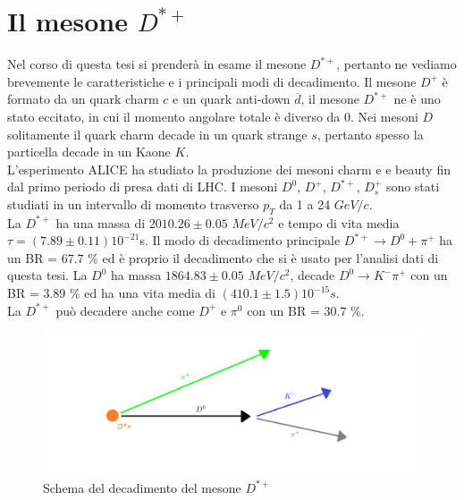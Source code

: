 \section{Il mesone $D^{*+}$} \label{mesoneD}
Nel corso di questa tesi si prenderà in esame il mesone $D^{*+}$, pertanto ne vediamo brevemente le caratteristiche e i principali modi di decadimento. Il mesone $D^{+}$ è formato da un quark charm $c$ e un quark anti-down $\overline{d}$, il mesone $D^{*+}$ ne è uno stato eccitato, in cui il momento angolare totale è diverso da 0. Nei mesoni $D$ solitamente il quark charm decade in un quark strange $s$, pertanto spesso la particella decade in un Kaone $K$. 
\\L'esperimento ALICE ha studiato la produzione dei mesoni charm e e beauty fin dal primo periodo di presa dati di LHC. I mesoni $D^0$, $D^+$, $D^{*+}$, $D_s^+$  sono stati studiati in un intervallo di momento trasverso $p_T$ da 1 a 24 $GeV/c$.  \cite{mesoniD}
\\La $D^{*+}$ ha una massa di $2010.26 \pm 0.05$ $MeV/c^2$ e tempo di vita media $ \tau = (7.89 \pm 0.11) {10^{-21}}$s. Il modo di decadimento principale $D^{*+} \rightarrow D^0 + \pi^+ $ ha un BR = $67.7$ $\% $ ed è proprio il decadimento che si è usato per l'analisi dati di questa tesi. La $D^0$ ha massa $ 1864.83 \pm 0.05 $ $MeV/c^2$, decade $D^0 \rightarrow K^- \pi^+$ con un BR = $3.89$ $\%$ ed ha una vita media di $(410.1 \pm 1.5 ) 10^{-15} s $.
\\La $D^{*+}$ può decadere anche come $D^+$ e $\pi^0$ con un BR = $30.7$ $\%$. \cite{PDG}

    \begin{figure}[htbp]
        \centering
        \includegraphics[width=1.0\linewidth]{introParticelle/decadimentoD.png}
        \caption{ Schema del decadimento del mesone $D^{*+}$}
        \label{fig:decadimentoD}
    \end{figure}









